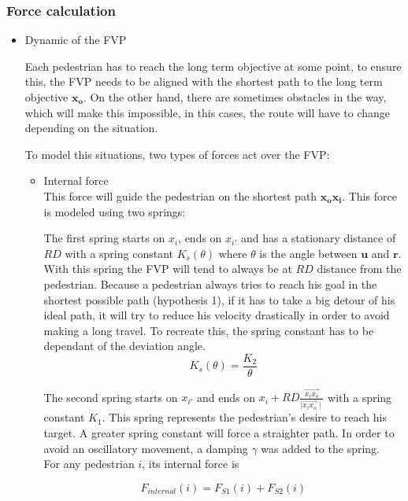 \documentclass[draftclsnofoot]{IEEEtran}
\begin{document}
\subsubsection{Force calculation}
\begin{itemize}
\item Dynamic of the FVP


Each pedestrian has to reach the long term objective at some point,
to ensure this, the FVP needs to be aligned with the shortest path
to the long term objective $\mathbf{x_o}$. On the other hand, there
are sometimes obstacles in the way, which will make this impossible,
in this cases, the route will have to change depending on the situation.


To model this situations, two types of forces act over the FVP:
\begin{itemize}

    \item Internal force \\

     This force will guide the pedestrian on the shortest path $\mathbf{x_{o}x_{i}}$.
    This force is modeled using two springs: 

    The first spring starts on $x_{i}$, ends on $x_{i'}$ and has a stationary
    distance of $RD$ with a spring constant $K_{s}(\theta)$ where $\theta$
    is the angle between $\mathbf{u}$ and $\mathbf{r}$. With this spring
    the FVP will tend to always be at $RD$ distance from the pedestrian.
    Because a pedestrian always tries to reach his goal in the shortest
    possible path (hypothesis 1), if it has to take a big detour of his
    ideal path, it will try to reduce his velocity drastically in order
    to avoid making a long travel. To recreate this, the spring constant
    has to be dependant of the deviation angle. 
    \[
         K_{s}(\theta)=\frac{K_{2}}{\theta}
    \]

    The second spring starts on $x_{i'}$ and ends on 
    $x_i + RD \frac{\vec{x_{i}x_{o}}}{\mid \vec{x_{i}x_{o}} \mid}$
    with a spring constant $K_{1}$.
    This spring represents the pedestrian's desire to reach his
    target. A greater spring constant will force a straighter path.
    In order to avoid an oscillatory movement,
    a damping $\gamma$ was added to the spring.\\

    For any pedestrian $i$, its internal force is

    \begin{equation}
        F_{internal}(i)= F_{S1}(i) + F_{S2}(i)
    \end{equation}
    

\end{itemize}
\end{itemize}
\end{document}
